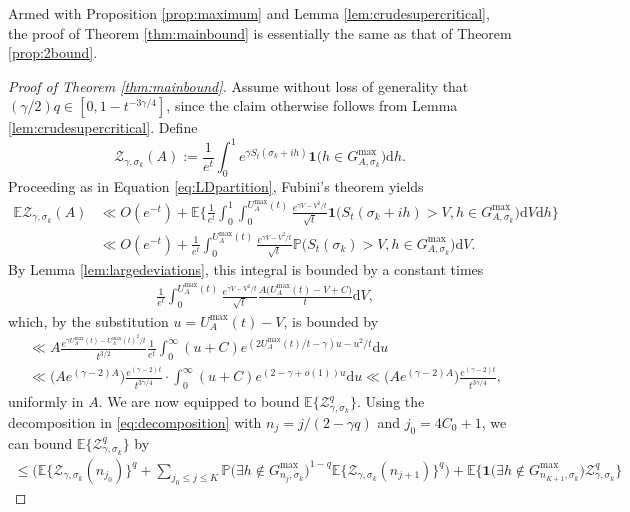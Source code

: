 \documentclass{amsart}
\theoremstyle{definition}
\theoremstyle{remark}
\numberwithin{equation}{section}
\begin{document}
Armed with Proposition \ref{prop:maximum} and Lemma \ref{lem:crudesupercritical}, the proof of Theorem \ref{thm:mainbound} is essentially the same as that of Theorem \ref{prop:2bound}.
\begin{proof}[Proof of Theorem \ref{thm:mainbound}]  Assume without loss of generality that $(\gamma/2) q\in [0,1-t^{-3\gamma/4}]$, since the claim otherwise follows from Lemma \ref{lem:crudesupercritical}. Define
\[
    \mathcal{Z}_{\gamma,\sigma_k}(A):=\frac{1}{e^t}\int_0^1 e^{\gamma S_t(\sigma_k+ih)}\mathbf{1}\big(h\in G_{A,\sigma_k}^{\text{max}}\big)\mathrm{d}h.
\]
Proceeding as in Equation \eqref{eq:LDpartition}, Fubini's theorem yields
\begin{align*}
    \mathbb{E}\mathcal{Z}_{\gamma,\sigma_k}(A) &\ll O(e^{-t})+\mathbb{E}\bigg\{ \frac{1}{e^t}\int_0^1\int_0^{U_A^{\text{max}}(t)} \frac{e^{\gamma V-V^2/t}}{\sqrt{t}}\mathbf{1}\big(S_t(\sigma_k+ih)>V, h\in G_{A,\sigma_k}^{\text{max}}\big)\mathrm{d}V\mathrm{d}h\bigg\}
    \\ &\ll O(e^{-t})+ \frac{1}{e^t}\int_0^{U_A^{\text{max}}(t)} \frac{e^{\gamma V-V^2/t}}{\sqrt{t}}\mathbb{P}\big(S_t(\sigma_k)>V, h\in G_{A,\sigma_k}^{\text{max}}\big)\mathrm{d}V.
\end{align*}
By Lemma \ref{lem:largedeviations}, this integral is bounded by a constant times
\begin{align*}
    &\frac{1}{e^t}\int_0^{U_A^{\text{max}}(t)} \frac{e^{\gamma V-V^2/t}}{\sqrt{t}}\frac{A\big(U_A^{\text{max}}(t)-V+C\big)}{t}\mathrm{d}V,
\end{align*}
    which, by the substitution $u=U_A^{\text{max}}(t)-V$, is bounded by
\begin{align}\label{eq:supercritical_ongood}
   &\ll A \frac{e^{\gamma U_A^{\max}(t)-U_A^{\max}(t)^2/t}}{t^{3/2}}\frac{1}{e^t}\int_0^\infty (u+C)e^{(2U_A^{\max}(t)/t-\gamma)u-u^2/t}\mathrm{d}u\nonumber  \\
   &\ll \big(Ae^{(\gamma-2)A}\big)\frac{e^{(\gamma-2)t}}{t^{3\gamma/4}}\cdot \int_{0}^\infty (u+C) e^{(2-\gamma+o(1))u}\mathrm{d}u \ll \big(Ae^{(\gamma-2)A}\big)\frac{e^{(\gamma-2)t}}{t^{3\gamma/4}},
\end{align}
uniformly in $A$.
We are now equipped to bound $\mathbb{E}\big\{\mathcal{Z}_{\gamma,\sigma_k}^q\big\}$. Using the decomposition in \eqref{eq:decomposition} with $n_j=j/(2-\gamma q)$ and $j_0=4C_0+1$, we can bound $
    \mathbb{E}\big\{\mathcal{Z}_{\gamma,\sigma_k}^q\big\}$ by
\begin{align*}
\leq \bigg(\mathbb{E}\big\{\mathcal{Z}_{\gamma,\sigma_k}(n_{j_0})\big\}^q+\sum_{j_0\leq j\leq K}\mathbb{P}\big(\exists h\notin G_{n_j,\sigma_k}^{\max{}}\big)^{1-q} \mathbb{E}\big\{\mathcal{Z}_{\gamma,\sigma_k}(n_{j+1})\big\}^q\bigg)\!+\mathbb{E}\big\{\mathbf{1}\big(\exists h\notin G_{n_{K+1},\sigma_k}^{\text{max}}\big)\mathcal{Z}_{\gamma,\sigma_k}^q\big\}

\end{align*}
\end{proof}
\end{document}
